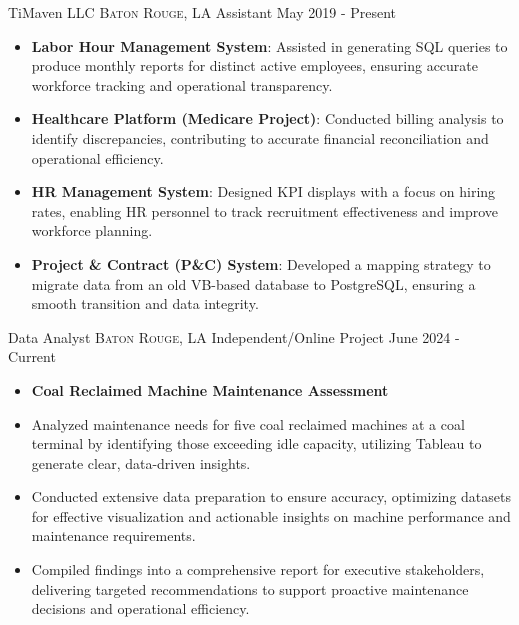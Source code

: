 \documentclass[10pt,a4paper]{article}
\begin{document}
\spacedhrule{0em}{-1em}


\headedsection
{TiMaven LLC}
{{\small \textsc{Baton Rouge, LA}}}
{Assistant}
{May 2019 - Present}
{
  \begin{itemize}
    \item \textbf{Labor Hour Management System}: Assisted in generating SQL queries to produce monthly reports for distinct active employees, ensuring accurate workforce tracking and operational transparency.
    \item \textbf{Healthcare Platform (Medicare Project)}: Conducted billing analysis to identify discrepancies, contributing to accurate financial reconciliation and operational efficiency.
    \item \textbf{HR Management System}: Designed KPI displays with a focus on hiring rates, enabling HR personnel to track recruitment effectiveness and improve workforce planning.
    \item \textbf{Project \& Contract (P\&C) System}: Developed a mapping strategy to migrate data from an old VB-based database to PostgreSQL, ensuring a smooth transition and data integrity.
  \end{itemize}
}

\headedsection
{Data Analyst}
{{\small \textsc{Baton Rouge, LA}}}
{Independent/Online Project}
{June 2024 - Current}
{
  \begin{itemize}
   \item[] \textbf{Coal Reclaimed Machine Maintenance Assessment}
    \item Analyzed maintenance needs for five coal reclaimed machines at a coal terminal by identifying those exceeding idle capacity, utilizing Tableau to generate clear, data-driven insights.
    \item Conducted extensive data preparation to ensure accuracy, optimizing datasets for effective visualization and actionable insights on machine performance and maintenance requirements.
     \item Compiled findings into a comprehensive report for executive stakeholders, delivering targeted recommendations to support proactive maintenance decisions and operational efficiency.
  \end{itemize}
}
\end{document}
